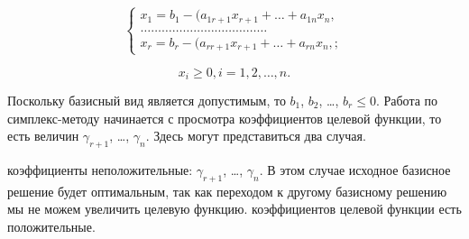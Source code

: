 \begin{equation*}
\begin{cases}
x_1 = b_1 - (a_{1r+1}x_{r+1} + \dots + a_{1n}x_n,\\
\dots\dots\dots\dots\dots\dots\dots\dots\dots\dots\dots\dots\\
x_r = b_r - (a_{rr+1}x_{r+1} + \dots + a_{rn}x_n,;
\end{cases}
\end{equation*}

$$x_i \geq 0, i=1,2,\dots,n.$$

Поскольку базисный вид является допустимым, то $b_1$, $b_2$, \dots, $b_r \leq 0$. Работа по симплекс-методу начинается с просмотра коэффициентов целевой функции, то есть величин $\gamma_{r+1}$, \dots, $\gamma_n$. Здесь могут представиться два случая.
		\begin{enumerate}
			\renewcommand{\theenumi}{(\arabic{enumi})}
			\renewcommand{\labelenumi}{\arabic{enumi})}
			 коэффициенты неположительные: $\gamma_{r+1}$, \dots, $\gamma_n$. В этом случае исходное базисное решение будет оптимальным, так как переходом к другому базисному решению мы не можем увеличить целевую функцию.
			 коэффициентов целевой функции есть положительные.
		\end{enumerate}

